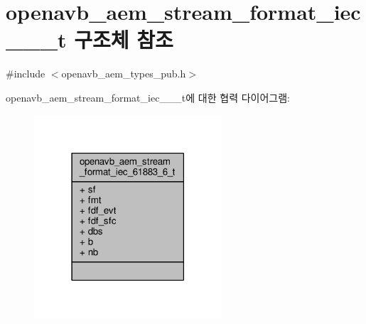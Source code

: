 \hypertarget{structopenavb__aem__stream__format__iec__61883__6__t}{}\section{openavb\+\_\+aem\+\_\+stream\+\_\+format\+\_\+iec\+\_\+\_\+\_\+t 구조체 참조}
\label{structopenavb__aem__stream__format__iec__61883__6__t}


{\ttfamily \#include $<$openavb\+\_\+aem\+\_\+types\+\_\+pub.\+h$>$}



openavb\+\_\+aem\+\_\+stream\+\_\+format\+\_\+iec\+\_\+\_\+\_\+t에 대한 협력 다이어그램\+:
\nopagebreak
\begin{figure}[H]
\begin{center}
\leavevmode
\includegraphics[width=198pt]{structopenavb__aem__stream__format__iec__61883__6__t__coll__graph}
\end{center}
\end{figure}

